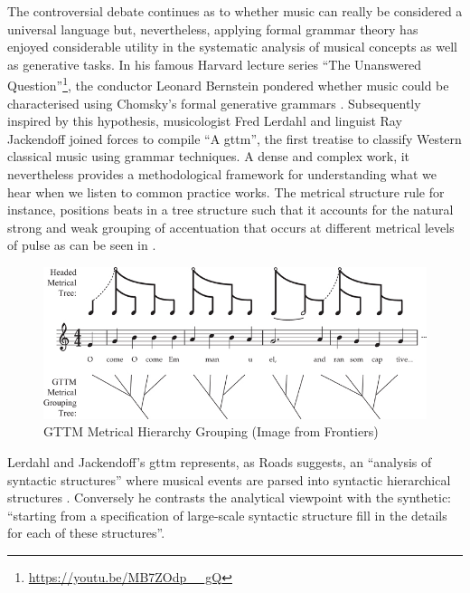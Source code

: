 The controversial debate continues as to whether music can really be considered a universal language \citep{Campbell1997, Savage2015} but, nevertheless, applying formal grammar theory has enjoyed considerable utility in the systematic analysis of musical concepts as well as generative tasks. In his famous Harvard lecture series ``The Unanswered Question''\footnote{\url{https://youtu.be/MB7ZOdp__gQ}}\citep{bernstein}, the conductor Leonard Bernstein pondered whether music could be characterised using Chomsky’s formal generative grammars \citep{Chomsky1957}. Subsequently inspired by this hypothesis, musicologist Fred Lerdahl and linguist Ray Jackendoff \citeyearpar{lerdahljackendoff} joined forces to compile ``A \acrfull{gttm}'', the first treatise to classify Western classical music using grammar techniques. A dense and complex work, it nevertheless provides a methodological framework for understanding what we hear when we listen to common practice works. The metrical structure rule for instance, positions beats in a tree structure such that it accounts for the natural strong and weak grouping of accentuation that occurs at different metrical levels of pulse as can be seen in .

\begin{figure}
	\begin{center}
		\includegraphics[width=\figSizeHundred]{ch03_symbolic/figures/metricalhierarchy.jpg}
	\end{center}
	\caption[GTTM Metrical Hierarchy Grouping]{GTTM Metrical Hierarchy Grouping (Image from Frontiers)}
	\label{fig:gttm}
\end{figure}

Lerdahl and Jackendoff’s \acrshort{gttm} represents, as Roads suggests, an “analysis of syntactic structures” where musical events are parsed into syntactic hierarchical structures \citep{Roads1996}. Conversely he contrasts the analytical viewpoint with the synthetic: “starting from a specification of large-scale syntactic structure fill in the details for each of these structures”.


